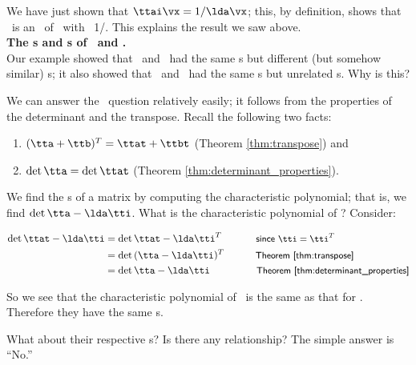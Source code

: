 We have just shown that $\ttai\vx = 1/\lda\vx$; this, by definition, shows that \vx\ is an \ev\ of \ttai\ with \el\ 1/\lda. This explains the result we saw above.\\

\noindent \textsf{\textbf{The \el s and \ev s of \tta\ and \ttat.}}\\

Our example showed that \tta\ and \ttat\ had the same \el s but different (but somehow similar) \ev s; it also showed that \ttb\ and \ttbt\ had the same \el s but unrelated \ev s. Why is this?

We can answer the \el\ question relatively easily; it follows from the properties of the determinant and the transpose. Recall the following two facts:
	\begin{enumerate}
	\item		$(\tta +\ttb)^T = \ttat + \ttbt$ (Theorem \ref{thm:transpose}) and 
	\item		$\det{\tta} = \det{\ttat}$ (Theorem \ref{thm:determinant_properties}).
	\end{enumerate}
	
We find the \el s of a matrix by computing the characteristic polynomial; that is, we find $\det{\tta - \lda\tti}$. What is the characteristic polynomial of \ttat? Consider:

\begin{align*}
\det{\ttat - \lda\tti} & = \det{\ttat - \lda\tti^T} \textsf{\hskip 34 pt \small since $\tti = \tti^T$} \\
 & = \det{(\tta - \lda\tti)^T}  \textsf{\hskip 31 pt\small Theorem \ref{thm:transpose}} \\
 & = \det{\tta-\lda\tti}   \textsf{\hskip 46 pt \small Theorem \ref{thm:determinant_properties}}\\
\end{align*} 

So we see that the characteristic polynomial of \ttat\ is the same as that for \tta. Therefore they have the same \el s. 

What about their respective \ev s? Is there any relationship? The simple answer is ``No.''


